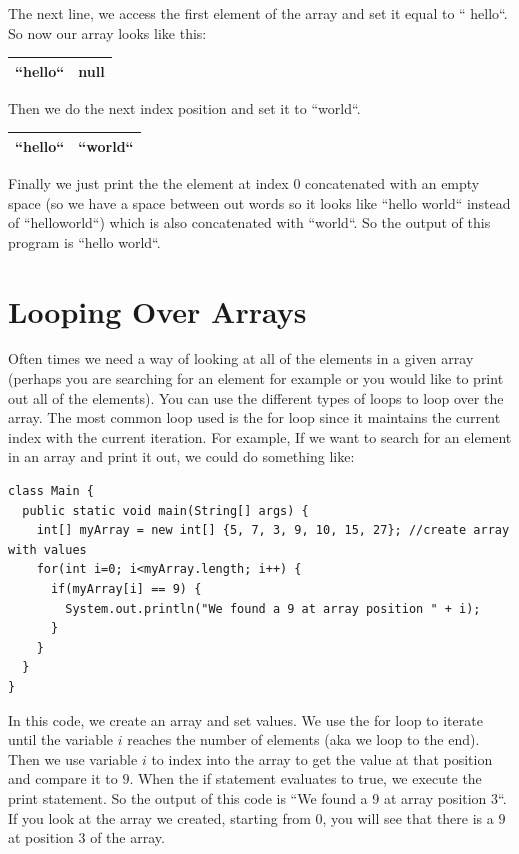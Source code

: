 \documentclass[11]{article}
\begin{document}
The next line, we access the first element of the array and set it equal to `` hello``. So now our array looks like this:

\begin{center}
	\begin{tabular}{ | c | c | } \hline
 	``hello`` & null  \\   \hline
	\end{tabular}
\end{center}

Then we do the next index position and set it to ``world``. 

\begin{center}
	\begin{tabular}{ | c | c | } \hline
 	``hello`` & ``world``  \\   \hline
	\end{tabular}
\end{center}

Finally we just print the the element at index $0$ concatenated with an empty space (so we have a space between out words so it looks like ``hello world`` instead of ``helloworld``) which is also concatenated with ``world``. So the output of this program is ``hello world``.	

\section{Looping Over Arrays}
Often times we need a way of looking at all of the elements in a given array (perhaps you are searching for an element for example or you would like to print out all of the elements). You can use the different types of loops to loop over the array. The most common loop used is the for loop since it maintains the current index with the current iteration. For example, If we want to search for an element in an array and print it out, we could do something like:

\begin{lstlisting}
class Main {
  public static void main(String[] args) {
    int[] myArray = new int[] {5, 7, 3, 9, 10, 15, 27}; //create array with values
    for(int i=0; i<myArray.length; i++) {
      if(myArray[i] == 9) {
        System.out.println("We found a 9 at array position " + i);
      }
    }
  }
}
\end{lstlisting}
In this code, we create an array and set values. We use the for loop to iterate until the variable $i$ reaches the number of elements (aka we loop to the end). Then we use variable $i$ to index into the array to get the value at that position and compare it to $9$. When the if statement evaluates to true, we execute the print statement. So the output of this code is ``We found a 9 at array position $3$``. If you look at the array we created, starting from $0$, you will see that there is a $9$ at position $3$ of the array.\\
\end{document}
